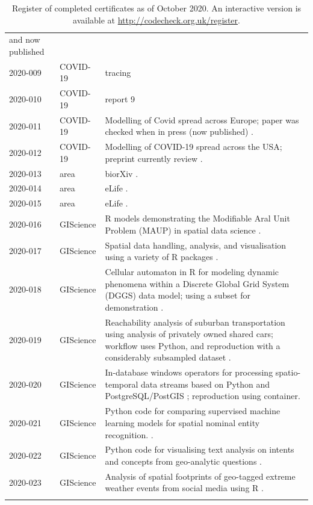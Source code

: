 \documentclass[12pt]{article}
\begin{document}
\begin{table}
\begin{tabular}{llp{11cm}}
    and now published \cite{Davies2020-vj} \\
    2020-009  \cite{cert-2020-009} & COVID-19 & tracing \\
    2020-010  \cite{cert-2020-010} & COVID-19 & report 9 \\
    2020-011  \cite{cert-2020-011} & COVID-19 & Modelling of Covid
    spread across Europe;  paper was checked when in press (now  published) \cite{Flaxman2020-yb}. \\
    2020-012  \cite{cert-2020-012} & COVID-19 & Modelling of COVID-19 spread across the USA; preprint currently review \cite{Unwin2020}. \\
    2020-013  \cite{cert-2020-013} & area & biorXiv \cite{Spitschan2020.06.02.129502}. \\
    2020-014  \cite{cert-2020-014} & area & eLife \cite{Sadeh2020}. \\
    2020-015  \cite{cert-2020-015} & area & eLife \cite{Liou2020}. \\
    2020-016  \cite{cert-2020-016} & GIScience & 
    R models demonstrating the Modifiable Aral Unit Problem (MAUP) in spatial data science \cite{Brunsdon2020}. \\
    2020-017  \cite{cert-2020-017} & GIScience & 
    Spatial data handling, analysis, and visualisation using a variety of R packages \cite{Bivand2020}. \\
    2020-018  \cite{cert-2020-018} & GIScience & 
    Cellular automaton in R for modeling dynamic phenomena within a Discrete Global Grid System (DGGS) data model; using a subset for demonstration \cite{Hojati2020}. \\
    2020-019  \cite{cert-2020-019} & GIScience & Reachability analysis of suburban transportation using analysis of privately owned shared cars; workflow uses Python, and reproduction with a considerably subsampled dataset \cite{Illium2020}. \\
    2020-020  \cite{cert-2020-020} & GIScience & In-database windows operators for processing spatio-temporal data streams based on Python and PostgreSQL/PostGIS \cite{Werner2020}; reproduction using container. \\
    2020-021  \cite{cert-2020-021} & GIScience & Python code for comparing supervised machine learning models for spatial nominal entity recognition. \cite{Medad2020}. \\
    2020-022  \cite{cert-2020-022} & GIScience & Python code for visualising text analysis on intents and concepts from geo-analytic questions \cite{Xu2020}. \\
    2020-023  \cite{cert-2020-023} & GIScience & Analysis of spatial footprints of geo-tagged extreme weather events from social media using R \cite{Owuor2020}. \\
    \\ \bottomrule
  \end{tabular}
  \caption{Register of completed certificates as of October 2020.  An interactive version
  is available at \url{http://codecheck.org.uk/register}. %
  }
  \label{tab:register}
\end{table}
\end{document}
